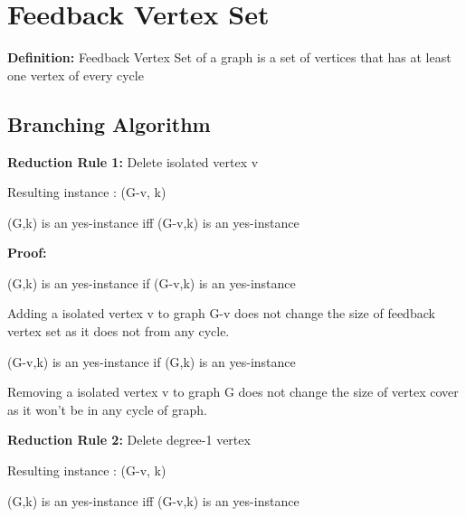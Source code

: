 \chapter{Feedback Vertex Set}

\textbf{Definition:} Feedback Vertex Set of a graph is a set of vertices that has at
least one vertex of every cycle


\section{Branching Algorithm}

\vspace{0.6cm}

\textbf{Reduction Rule 1:} Delete isolated vertex v 

Resulting instance : (G-v, k) 

\begin{theorem}    
(G,k) is an yes-instance iff (G-v,k) is an yes-instance
\end{theorem}

\textbf{Proof:}

\hfill \vspace{-1.5cm}
      \begin{center}
              (G,k) is an yes-instance if (G-v,k) is an yes-instance 
       \end{center} \vspace{-0.2cm}
Adding a isolated vertex v to graph G-v does not change the size of feedback vertex set as 
it does not from any cycle.

\newpage
\begin{center}
    (G-v,k) is an yes-instance if (G,k) is an yes-instance    
\end{center} \vspace{-0.2cm}
Removing a isolated vertex v to graph G does not change the size of vertex cover as 
it won't be in any cycle of graph.

\textbf{Reduction Rule 2:} Delete degree-1 vertex 

Resulting instance : (G-v, k) 

\begin{theorem}
    (G,k) is an yes-instance iff (G-v,k) is an yes-instance
\end{theorem}

